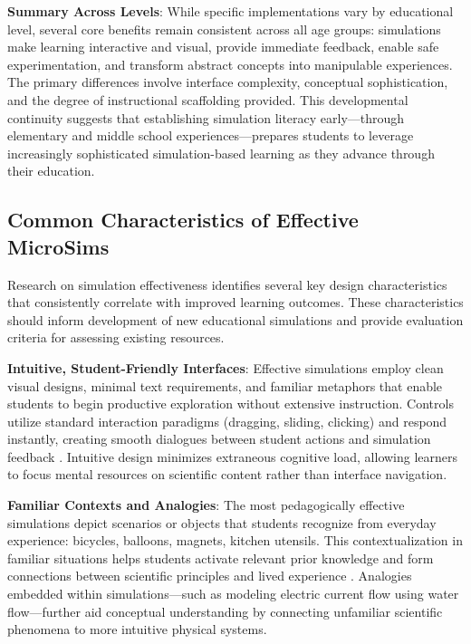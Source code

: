 \textbf{Summary Across Levels}: While specific implementations vary by educational level, several core benefits remain consistent across all age groups: simulations make learning interactive and visual, provide immediate feedback, enable safe experimentation, and transform abstract concepts into manipulable experiences. The primary differences involve interface complexity, conceptual sophistication, and the degree of instructional scaffolding provided. This developmental continuity suggests that establishing simulation literacy early—through elementary and middle school experiences—prepares students to leverage increasingly sophisticated simulation-based learning as they advance through their education.

\subsection{Common Characteristics of Effective MicroSims}

Research on simulation effectiveness identifies several key design characteristics that consistently correlate with improved learning outcomes. These characteristics should inform development of new educational simulations and provide evaluation criteria for assessing existing resources.

\textbf{Intuitive, Student-Friendly Interfaces}: Effective simulations employ clean visual designs, minimal text requirements, and familiar metaphors that enable students to begin productive exploration without extensive instruction. Controls utilize standard interaction paradigms (dragging, sliding, clicking) and respond instantly, creating smooth dialogues between student actions and simulation feedback \cite{phet2023}. Intuitive design minimizes extraneous cognitive load, allowing learners to focus mental resources on scientific content rather than interface navigation.

\textbf{Familiar Contexts and Analogies}: The most pedagogically effective simulations depict scenarios or objects that students recognize from everyday experience: bicycles, balloons, magnets, kitchen utensils. This contextualization in familiar situations helps students activate relevant prior knowledge and form connections between scientific principles and lived experience \cite{phet2023}. Analogies embedded within simulations—such as modeling electric current flow using water flow—further aid conceptual understanding by connecting unfamiliar scientific phenomena to more intuitive physical systems.


